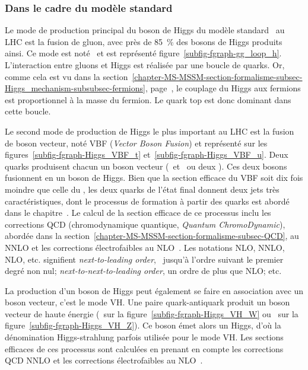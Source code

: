 \subsubsection{Dans le cadre du modèle standard}\label{chapter-MS-MSSM-section-pheno_Higgs_MSSM-subsec-production-SM}
Le mode de production principal du boson de Higgs du modèle standard \higgs\ au LHC est la fusion de gluon, avec près de \SI{85}{\%} des bosons de Higgs produits ainsi.
Ce mode est noté \gluon\gluon\higgs\ et est représenté figure~\ref{subfig-fgraph-gg_loop_h}.
L'interaction entre gluons et Higgs est réalisée par une boucle de quarks.
Or, comme cela est vu dans la section~\ref{chapter-MS-MSSM-section-formalisme-subsec-Higgs_mechanism-subsubsec-fermions}, page~\pageref{chapter-MS-MSSM-section-formalisme-subsec-Higgs_mechanism-subsubsec-fermions}, le couplage du Higgs aux fermions est proportionnel à la masse du fermion.
Le quark top est donc dominant dans cette boucle.
\par Le second mode de production de Higgs le plus important au LHC est la fusion de boson vecteur, noté VBF (\emph{Vector Boson Fusion}) et représenté sur les figures~\ref{subfig-fgraph-Higgs_VBF_t} et~\ref{subfig-fgraph-Higgs_VBF_u}.
Deux quarks produisent chacun un boson vecteur (\Wbosonplus\ et \Wbosonminus\ ou deux \Zboson).
Ces deux bosons fusionnent en un boson de Higgs.
Bien que la section efficace du VBF soit dix fois moindre que celle du \gluon\gluon\higgs, les deux quarks de l'état final donnent deux jets très caractéristiques, dont le processus de formation à partir des quarks est abordé dans le chapitre~.
Le calcul de la section efficace de ce processus inclu les corrections QCD (chromodynamique quantique, \emph{Quantum ChromoDynamic}), abordée dans la section~\ref{chapter-MS-MSSM-section-formalisme-subsec-QCD}, au NNLO et les corrections électrofaibles au NLO~\cite{Higgs_xsec_book_4,PhysRevD.85.035002}.
Les notations NLO, NNLO, NLO, etc. signifient \emph{next-to-leading order}, \ie\ jusqu'à l'ordre suivant le premier degré non nul; \emph{next-to-next-to-leading order}, un ordre de plus que NLO; etc.
\par La production d'un boson de Higgs peut également se faire en association avec un boson vecteur, c'est le mode VH.
Une paire quark-antiquark produit un boson vecteur de haute énergie (\Wboson\ sur la figure~\ref{subfig-fgraph-Higgs_VH_W} ou \Zboson\ sur la figure~\ref{subfig-fgraph-Higgs_VH_Z}).
Ce boson émet alors un Higgs, d'où la dénomination \og Higgs-strahlung \fg{} parfois utilisée pour le mode VH.
Les sections efficaces de ces processus sont calculées en prenant en compte les corrections QCD NNLO et les corrections électrofaibles au NLO~\cite{Higgs_xsec_book_4}.
